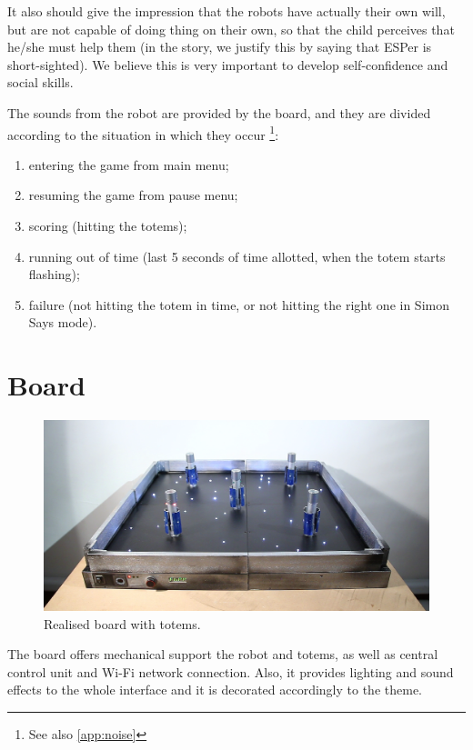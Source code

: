 \documentclass[a4paper,twoside]{book}
\begin{document}
It also should give the impression that the robots have actually their own will, but are not capable of doing thing on their own, so that the child perceives that he/she must help them (in the story, we justify this by saying that ESPer is short-sighted). We believe this is very important to develop self-confidence and social skills.

\beforelist* The sounds from the robot are provided by the board, and they are divided according to the situation in which they occur%
\footnote{See also \autoref{app:noise}}:
\begin{enumerate}
\item entering the game from main menu;
\item resuming the game from pause menu;
\item scoring (hitting the totems);
\item running out of time (last 5 seconds of time allotted, when the totem starts flashing);
\item failure (not hitting the totem in time, or not hitting the right one in Simon Says mode).
\end{enumerate}
\afterlist*

\section{Board}

\begin{figure}[h]
\includegraphics[width=\linewidth]{img/IMG_20160616_111353} 
\caption{Realised board with totems.}
\end{figure}

The board offers mechanical support the robot and totems, as well as central control unit and Wi-Fi network connection. Also, it provides lighting and sound effects to the whole interface and it is decorated accordingly to the theme.
\end{document}
